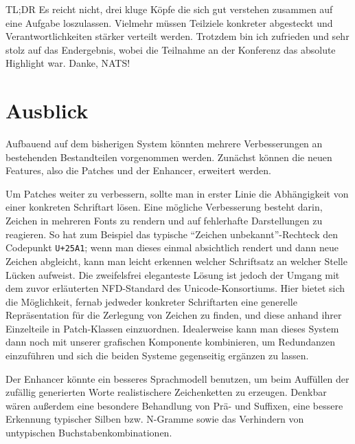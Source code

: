 \documentclass[11pt,a4paper]{article}
\begin{document}
TL;DR Es reicht nicht, drei kluge Köpfe die sich gut verstehen zusammen auf eine Aufgabe loszulassen. Vielmehr müssen Teilziele konkreter abgesteckt und Verantwortlichkeiten stärker verteilt werden. Trotzdem bin ich zufrieden und sehr stolz auf das Endergebnis, wobei die Teilnahme an der Konferenz das absolute Highlight war. Danke, NATS!

\section{Ausblick}
\label{sec:future_work}

Aufbauend auf dem bisherigen System könnten mehrere Verbesserungen an bestehenden Bestandteilen vorgenommen werden.
Zunächst können die neuen Features, also die Patches und der Enhancer, erweitert werden.

Um Patches weiter zu verbessern, sollte man in erster Linie die Abhängigkeit von einer konkreten Schriftart lösen. Eine mögliche Verbesserung besteht darin, Zeichen in mehreren Fonts zu rendern und auf fehlerhafte Darstellungen zu reagieren. So hat zum Beispiel das typische \enquote{Zeichen unbekannt}-Rechteck den Codepunkt \texttt{U+25A1}; wenn man dieses einmal absichtlich rendert und dann neue Zeichen abgleicht, kann man leicht erkennen welcher Schriftsatz an welcher Stelle Lücken aufweist.
Die zweifelsfrei eleganteste Lösung ist jedoch der Umgang mit dem zuvor erläuterten NFD-Standard des Unicode-Konsortiums. Hier bietet sich die Möglichkeit, fernab jedweder konkreter Schriftarten eine generelle Repräsentation für die Zerlegung von Zeichen zu finden, und diese anhand ihrer Einzelteile in Patch-Klassen einzuordnen. Idealerweise kann man dieses System dann noch mit unserer grafischen Komponente kombinieren, um Redundanzen einzuführen und sich die beiden Systeme gegenseitig ergänzen zu lassen.

Der Enhancer könnte ein besseres Sprachmodell benutzen, um beim Auffüllen der zufällig generierten Worte realistischere Zeichenketten zu erzeugen.
Denkbar wären außerdem eine besondere Behandlung von Prä- und Suffixen, eine bessere Erkennung typischer Silben bzw. N-Gramme sowie das Verhindern von untypischen Buchstabenkombinationen.
\end{document}
